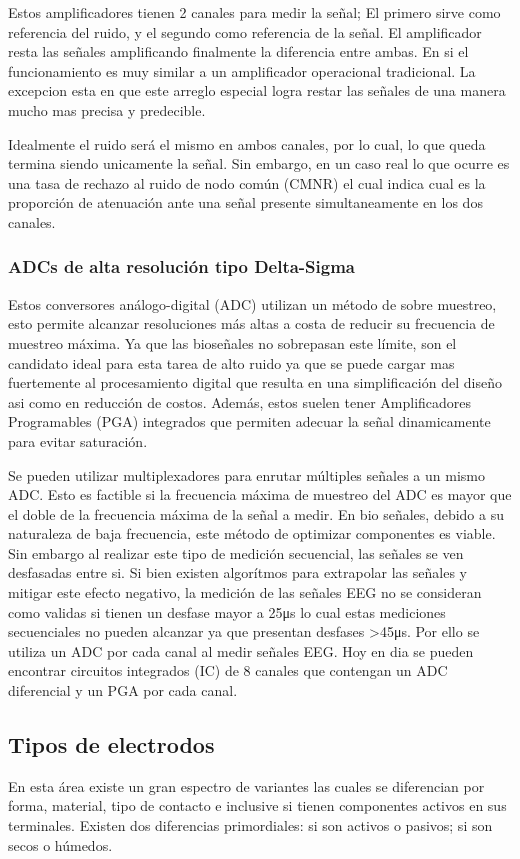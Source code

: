 \documentclass[11pt]{article}
\begin{document}
Estos amplificadores tienen 2 canales para medir la señal; El primero sirve como referencia del ruido, y el segundo como referencia de la señal. El amplificador resta las señales amplificando finalmente la diferencia entre ambas. En si el funcionamiento es muy similar a un amplificador operacional tradicional. La excepcion esta en que este arreglo especial logra restar las señales de una manera mucho mas precisa y predecible.

Idealmente el ruido será el mismo en ambos canales, por lo cual, lo que queda termina siendo unicamente la señal. Sin embargo, en un caso real lo que ocurre es una tasa de rechazo al ruido de nodo común (CMNR) el cual indica cual es la proporción de atenuación ante una señal presente simultaneamente en los dos canales.

\subsubsection{ADCs de alta resolución tipo Delta-Sigma}
\label{sec:orgb1f0faf}
Estos conversores análogo-digital (ADC) utilizan un método de sobre muestreo, esto permite alcanzar resoluciones más altas a costa de reducir su frecuencia de muestreo máxima. Ya que las bioseñales no sobrepasan este límite, son el candidato ideal para esta tarea de alto ruido ya que se puede cargar mas fuertemente al procesamiento digital que resulta en una simplificación del diseño asi como en reducción de costos. Además, estos suelen tener Amplificadores Programables (PGA) integrados que permiten adecuar la señal dinamicamente para evitar saturación.

Se pueden utilizar multiplexadores para enrutar múltiples señales a un mismo ADC. Esto es factible si la frecuencia máxima de muestreo del ADC es mayor que el doble de la frecuencia máxima de la señal a medir. En bio señales, debido a su naturaleza de baja frecuencia, este método de optimizar componentes es viable. Sin embargo al realizar este tipo de medición secuencial, las señales se ven desfasadas entre si. Si bien existen algorítmos para extrapolar las señales y mitigar este efecto negativo, la medición de las señales EEG no se consideran como validas si tienen un desfase mayor a 25μs lo cual estas mediciones secuenciales no pueden alcanzar ya que presentan desfases >45μs. Por ello se utiliza un ADC por cada canal al medir señales EEG. Hoy en dia se pueden encontrar circuitos integrados (IC) de 8 canales que contengan un ADC diferencial y un PGA por cada canal.

\subsection{Tipos de electrodos}
\label{sec:orgbe9c9ef}
En esta área existe un gran espectro de variantes las cuales se diferencian por forma, material, tipo de contacto e inclusive si tienen componentes activos en sus terminales. Existen dos diferencias primordiales: si son activos o pasivos; si son secos o húmedos.
\end{document}

